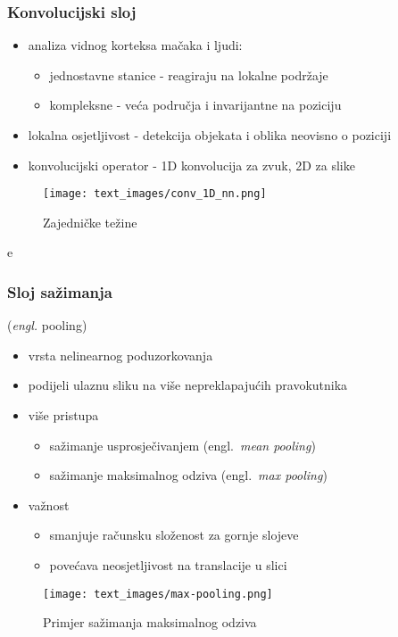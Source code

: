 \documentclass[utf8]{beamer}
\newcommand{\engl}[1]{(engl.~\emph{#1})}
\begin{document}
\begin{frame}
\frametitle{Konvolucijski sloj}

\begin{itemize}
\item analiza vidnog korteksa mačaka i ljudi:
  \begin{itemize}
    \item jednostavne stanice - reagiraju na lokalne podržaje
    \item kompleksne - veća područja i invarijantne na poziciju
  \end{itemize}
  \item lokalna osjetljivost - detekcija objekata i oblika neovisno o poziciji
  \item konvolucijski operator - 1D konvolucija za zvuk, 2D za slike
\end{itemize}


\begin{figure}[htb]
  \centering
  \texttt{[image: text\_images/conv\_1D\_nn.png]}
  \caption{Zajedničke težine}
  \label{fig:conv-nn}
\end{figure}e

\end{frame}


\begin{frame}
\frametitle{Sloj sažimanja}

(\emph{engl.} pooling)

\begin{itemize}
  \item vrsta nelinearnog poduzorkovanja
  \item podijeli ulaznu sliku na više nepreklapajućih pravokutnika
  \item više pristupa
  \begin{itemize}
    \item sažimanje usprosječivanjem \engl{mean pooling}
    \item sažimanje maksimalnog odziva \engl{max pooling}
  \end{itemize}
  \item važnost
  \begin{itemize}
    \item smanjuje računsku složenost za gornje slojeve
    \item povećava neosjetljivost na translacije u slici
  \end{itemize}
\end{itemize}

\begin{figure}[htb]
\centering
\texttt{[image: text\_images/max-pooling.png]}
\caption{Primjer sažimanja maksimalnog odziva}
\end{figure}

\end{frame}
\end{document}
